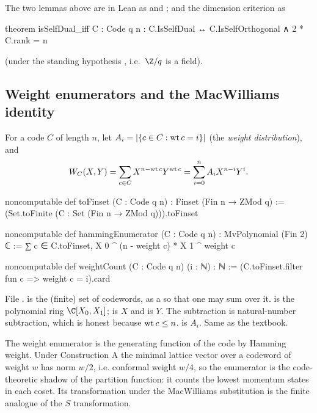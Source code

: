 The two lemmas above are in Lean as  and
; and the dimension criterion as
\begin{leancode}
theorem isSelfDual_iff {C : Code q n} :
    C.IsSelfDual ↔ C.IsSelfOrthogonal ∧ 2 * C.rank = n
\end{leancode}
(under the standing hypothesis , i.e.\ $\Z/q$ is a field).

\subsection{Weight enumerators and the MacWilliams identity}\label{ch02:sec:macwilliams}

\begin{definition}
For a code $C$ of length $n$, let $A_i=|\{c\in C:\operatorname{wt} c=i\}|$ (the \emph{weight
distribution}), and
\begin{equation*}
W_C(X,Y)=\sum_{c\in C}X^{n-\operatorname{wt} c}Y^{\operatorname{wt} c}=\sum_{i=0}^nA_iX^{n-i}Y^i .
\end{equation*}
\end{definition}
\begin{leancode}
noncomputable def toFinset (C : Code q n) : Finset (Fin n → ZMod q) :=
  (Set.toFinite (C : Set (Fin n → ZMod q))).toFinset

noncomputable def hammingEnumerator (C : Code q n) : MvPolynomial (Fin 2) ℂ :=
  ∑ c ∈ C.toFinset, X 0 ^ (n - weight c) * X 1 ^ weight c

noncomputable def weightCount (C : Code q n) (i : ℕ) : ℕ :=
  (C.toFinset.filter fun c => weight c = i).card
\end{leancode}
\begin{dictionary}
File .   is the (finite) set of codewords, as a
 so that one may sum over it.   is the polynomial ring
$\C[X_0,X_1]$;  is $X$ and  is $Y$.  The subtraction  is
natural-number subtraction, which is honest because $\operatorname{wt} c\le n$.   is
$A_i$.  Same as the textbook.
\end{dictionary}
\begin{physics}
The weight enumerator is the generating function of the code by Hamming weight. Under Construction A the minimal lattice vector over a codeword of weight $w$ has norm $w/2$, i.e. conformal weight $w/4$, so the enumerator is the code-theoretic shadow of the partition function: it counts the lowest momentum states in each coset. Its transformation under the MacWilliams substitution is the finite analogue of the $S$ transformation.
\end{physics}

